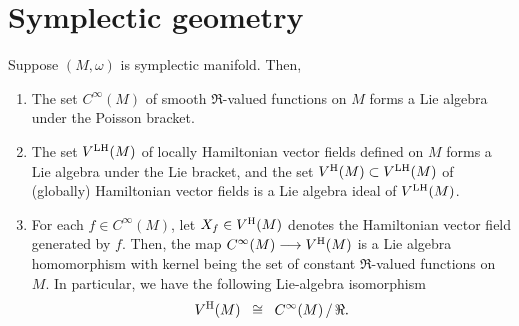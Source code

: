 

\section{Symplectic geometry}
\setcounter{theorem}{0}
\setcounter{equation}{0}


\renewcommand{\theenumi}{\roman{enumi}}
\renewcommand{\labelenumi}{\textnormal{(\theenumi)}$\;\;$}


\begin{theorem}
\mbox{}
\vskip 0.2cm
\noindent
Suppose $(M,\omega)$ is symplectic manifold. Then,
\begin{enumerate}
\item
	The set $C^{\infty}(M)$ of smooth $\Re$-valued functions on $M$
	forms a Lie algebra under the Poisson bracket.
\item
	The set $V^{\textnormal{LH}}(M)$ of locally Hamiltonian vector fields defined on $M$
	forms a Lie algebra under the Lie bracket, and
	the set $V^{\textnormal{H}}(M) \subset V^{\textnormal{LH}}(M)$ of (globally) Hamiltonian vector fields
	is a Lie algebra ideal of $V^{\textnormal{LH}}(M)$.
\item
	For each $f \in C^{\infty}(M)$, let $X_{f} \in V^{\textnormal{H}}(M)$ denotes the Hamiltonian vector field generated by $f$.
	Then, the map $C^{\infty}(M) \longrightarrow V^{\textnormal{H}}(M)$ is a Lie algebra homomorphism
	with kernel being the set of constant $\Re$-valued functions on $M$.
	In particular, we have the following Lie-algebra isomorphism
	\begin{equation*}
	V^{\textnormal{H}}(M) \;\; \cong \;\; C^{\infty}(M) \,/\, \Re.
	\end{equation*}
\end{enumerate}
\end{theorem}



